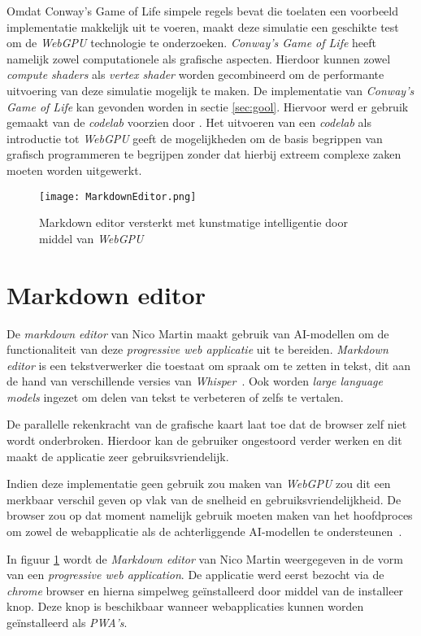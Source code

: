 Omdat Conway's Game of Life simpele regels bevat die toelaten een voorbeeld implementatie makkelijk uit te voeren, maakt deze simulatie een geschikte test om de \textit{WebGPU} technologie te onderzoeken. \textit{Conway's Game of Life} heeft namelijk zowel computationele als grafische aspecten. Hierdoor kunnen zowel \textit{compute shaders} als \textit{vertex shader} worden gecombineerd om de performante uitvoering van deze simulatie mogelijk te maken. De implementatie van \textit{Conway's Game of Life} kan gevonden worden in sectie \ref{sec:gool}. Hiervoor werd er gebruik gemaakt van de \textit{codelab} voorzien door \textcite{google2023}. Het uitvoeren van een \textit{codelab} als introductie tot \textit{WebGPU} geeft de mogelijkheden om de basis begrippen van grafisch programmeren te begrijpen zonder dat hierbij extreem complexe zaken moeten worden uitgewerkt.

\begin{figure}
    \texttt{[image: MarkdownEditor.png]}
    \caption[Markdown editor met AI en \textit{WebGPU}~\autocite{Martin2020}]{
        Markdown editor versterkt met kunstmatige intelligentie door middel van \textit{WebGPU}~\autocite{Martin2020}
    }
    \label{fig:MardownEditor}
\end{figure}

\section{Markdown editor}

De \textit{markdown editor} van Nico Martin maakt gebruik van AI-modellen om de functionaliteit van deze \textit{progressive web applicatie} uit te bereiden. \textit{Markdown editor} is een tekstverwerker die toestaat om spraak om te zetten in tekst, dit aan de hand van verschillende versies van \textit{Whisper}~\autocite{radford2022whisper}. Ook worden \textit{large language models} ingezet om delen van tekst te verbeteren of zelfs te vertalen. 

\bigbreak{}

De parallelle rekenkracht van de grafische kaart laat toe dat de browser zelf niet wordt onderbroken. Hierdoor kan de gebruiker ongestoord verder werken en dit maakt de applicatie zeer gebruiksvriendelijk.

\bigbreak{}

Indien deze implementatie geen gebruik zou maken van \textit{WebGPU} zou dit een merkbaar verschil geven op vlak van de snelheid en gebruiksvriendelijkheid. De browser zou op dat moment namelijk gebruik moeten maken van het hoofdproces om  zowel de webapplicatie als de achterliggende AI-modellen te ondersteunen~\autocite{Martin2020}.

\bigbreak{}

In figuur \ref{fig:MardownEditor} wordt de \textit{Markdown editor} van Nico Martin weergegeven in de vorm van een \textit{progressive web application}. De applicatie werd eerst bezocht via de \textit{chrome} browser en hierna simpelweg geïnstalleerd door middel van de installeer knop. Deze knop is beschikbaar wanneer webapplicaties kunnen worden geïnstalleerd als \textit{PWA's}.